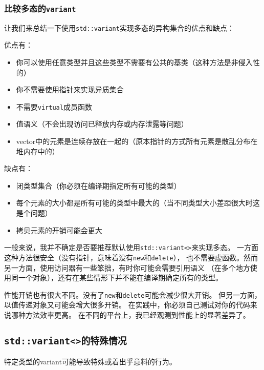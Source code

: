 \subsubsection{比较多态的\texttt{variant}}
让我们来总结一下使用\texttt{std::variant}实现多态的异构集合的优点和缺点：

优点有：
\begin{itemize}[leftmargin=*]
    \item 你可以使用任意类型并且这些类型不需要有公共的基类（这种方法是非侵入性的）
    \item 你不需要使用指针来实现异质集合
    \item 不需要\texttt{virtual}成员函数
    \item 值语义（不会出现访问已释放内存或内存泄露等问题）
    \item vector中的元素是连续存放在一起的（原本指针的方式所有元素是散乱分布在堆内存中的）
\end{itemize}
缺点有：
\begin{itemize}[leftmargin=*]
    \item 闭类型集合（你必须在编译期指定所有可能的类型）
    \item 每个元素的大小都是所有可能的类型中最大的（当不同类型大小差距很大时这是个问题）
    \item 拷贝元素的开销可能会更大
\end{itemize}
一般来说，我并不确定是否要推荐默认使用\texttt{std::variant<>}来实现多态。
一方面这种方法很安全（没有指针，意味着没有\texttt{new}和\texttt{delete}），
也不需要虚函数。然而另一方面，使用访问器有一些笨拙，有时你可能会需要引用语义
（在多个地方使用同一个对象），还有在某些情形下并不能在编译期确定所有的类型。

性能开销也有很大不同。没有了\texttt{new}和\texttt{delete}可能会减少很大开销。
但另一方面，以值传递对象又可能会增大很多开销。
在实践中，你必须自己测试对你的代码来说哪种方法效率更高。
在不同的平台上，我已经观测到性能上的显著差异了。

\subsection{\texttt{std::variant<>的特殊情况}}\label{ch16.5}
特定类型的variant可能导致特殊或着出乎意料的行为。


